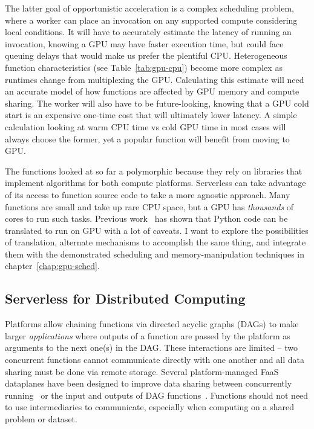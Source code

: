 The latter goal of opportunistic acceleration is a complex scheduling problem, where a worker can place an invocation on any supported compute considering local conditions.
It will have to accurately estimate the latency of running an invocation, knowing a GPU may have faster execution time, but could face queuing delays that would make us prefer the plentiful CPU.
Heterogeneous function characteristics (see Table~\ref{tab:gpu-cpu}) become more complex as runtimes change from multiplexing the GPU.
Calculating this estimate will need an accurate model of how functions are affected by GPU memory and compute sharing.
The worker will also have to be future-looking, knowing that a GPU cold start is an expensive one-time cost that will ultimately lower latency.
A simple calculation looking at warm CPU time vs cold GPU time in most cases will always choose the former, yet a popular function will benefit from moving to GPU.

The functions looked at so far a polymorphic because they rely on libraries that implement algorithms for both compute platforms.
Serverless can take advantage of its access to function source code to take a more agnostic approach.
Many functions are small and take up rare CPU space, but a GPU has \emph{thousands} of cores to run such tasks.
Previous work~\cite{ginzburg2023vectorvisor} has shown that Python code can be translated to run on GPU with a lot of caveats.
I want to explore the possibilities of translation, alternate mechanisms to accomplish the same thing, and integrate them with the demonstrated scheduling and memory-manipulation techniques in chapter~\ref{chap:gpu-sched}.

\subsection{Serverless for Distributed Computing}
\label{sec:new-mpi}

Platforms allow chaining functions via directed acyclic graphs (DAGs) to make larger \emph{applications} where outputs of a function are passed by the platform as arguments to the next one(s) in the DAG.
These interactions are limited -- two concurrent functions cannot communicate directly with one another and all data sharing must be done via remote storage.
Several platform-managed FaaS dataplanes have been designed to improve data sharing between concurrently running~\cite{giantsidi2023flexlog,sreekanti2020fault} or the input and outputs of DAG functions~\cite{mvondo2021ofc,romero2021faa,abdi2023palette}.
Functions should not need to use intermediaries to communicate, especially when computing on a shared problem or dataset.

